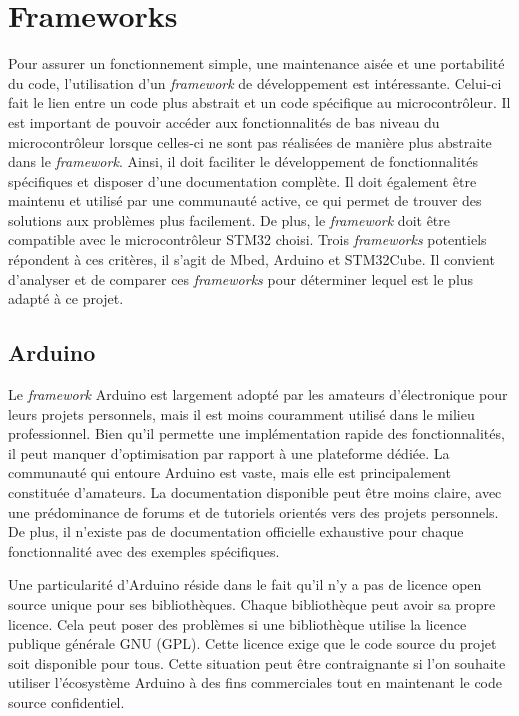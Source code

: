 \section{Frameworks}

Pour assurer un fonctionnement simple, une maintenance aisée et une portabilité du code, l'utilisation d'un \textit{\gls{framework}} de développement est intéressante.
Celui-ci fait le lien entre un code plus abstrait et un code spécifique au microcontrôleur.
Il est important de pouvoir accéder aux fonctionnalités de bas niveau du microcontrôleur lorsque celles-ci ne sont pas réalisées de manière plus abstraite dans le \textit{\gls{framework}}.
Ainsi, il doit faciliter le développement de fonctionnalités spécifiques et disposer d'une documentation complète.
Il doit également être maintenu et utilisé par une communauté active, ce qui permet de trouver des solutions aux problèmes plus facilement.
De plus, le \textit{\gls{framework}} doit être compatible avec le microcontrôleur STM32 choisi.
Trois \textit{\gls{framework}s} potentiels répondent à ces critères, il s'agit de Mbed, Arduino et STM32Cube.
Il convient d'analyser et de comparer ces \textit{\gls{framework}s} pour déterminer lequel est le plus adapté à ce projet.

\subsection{Arduino}

Le \textit{\gls{framework}} Arduino est largement adopté par les amateurs d'électronique pour leurs projets personnels, mais il est moins couramment utilisé dans le milieu professionnel.
Bien qu'il permette une implémentation rapide des fonctionnalités, il peut manquer d'optimisation par rapport à une plateforme dédiée.
La communauté qui entoure Arduino est vaste, mais elle est principalement constituée d'amateurs.
La documentation disponible peut être moins claire, avec une prédominance de forums et de tutoriels orientés vers des projets personnels.
De plus, il n'existe pas de documentation officielle exhaustive pour chaque fonctionnalité avec des exemples spécifiques.

Une particularité d'Arduino réside dans le fait qu'il n'y a pas de licence open source unique pour ses bibliothèques.
Chaque bibliothèque peut avoir sa propre licence.
Cela peut poser des problèmes si une bibliothèque utilise la licence publique générale GNU (GPL).
Cette licence exige que le code source du projet soit disponible pour tous.
Cette situation peut être contraignante si l'on souhaite utiliser l'écosystème Arduino à des fins commerciales tout en maintenant le code source confidentiel.

